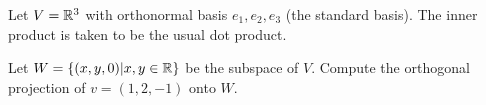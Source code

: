 \documentclass{amsart}
\begin{document}
	
\vspace{2em}


Let $V=\mathbb{R}^3$ with orthonormal basis $e_1,e_2,e_3$ (the standard basis). The inner product is taken to be the usual dot product.

Let $W=\{(x,y,0)|x,y\in\mathbb{R}\}$ be the subspace of $V$. Compute the orthogonal projection of $v=(1,2,-1)$ onto $W$.

%
%
\end{document}
